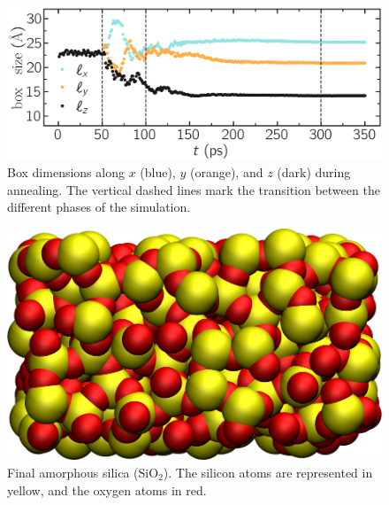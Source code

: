 \documentclass[9pt,tutorial]{livecoms}
\begin{document}
\begin{figure}
\centering
\includegraphics[width=\linewidth]{GCMC-dimension}
\caption{Box dimensions along $x$ (blue), $y$ (orange), and $z$ (dark) during
annealing. The vertical dashed lines mark the transition between the different
phases of the simulation.}
\label{fig:GCMC-dimension}
\end{figure}

\begin{figure}
\centering
\includegraphics[width=0.9\linewidth]{GCMC-snapshot}
\caption{Final amorphous silica ($\text{SiO}_2$). The silicon atoms are
represented in yellow, and the oxygen atoms in red.}
\label{fig:GCMC-snapshot}
\end{figure}
\end{document}
